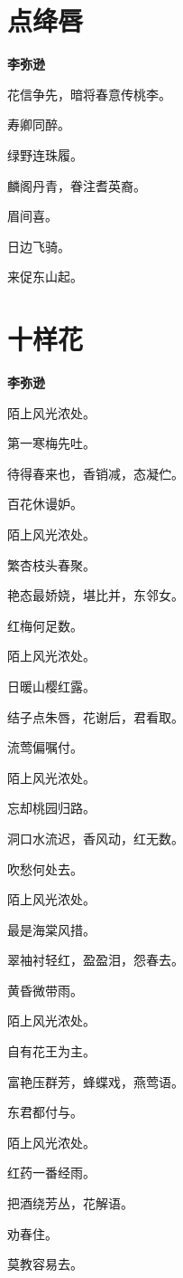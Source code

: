 \documentclass[12pt,a4paper]{ctexbook}
\begin{document}
\section{点绛唇}
\textbf{李弥逊}\par\vspace{0.5em}
花信争先，暗将春意传桃李。\par
寿卿同醉。\par
绿野连珠履。\par
麟阁丹青，眷注耆英裔。\par
眉间喜。\par
日边飞骑。\par
来促东山起。\par

\section{十样花}
\textbf{李弥逊}\par\vspace{0.5em}
陌上风光浓处。\par
第一寒梅先吐。\par
待得春来也，香销减，态凝伫。\par
百花休谩妒。\par
陌上风光浓处。\par
繁杏枝头春聚。\par
艳态最娇娆，堪比并，东邻女。\par
红梅何足数。\par
陌上风光浓处。\par
日暖山樱红露。\par
结子点朱唇，花谢后，君看取。\par
流莺偏嘱付。\par
陌上风光浓处。\par
忘却桃园归路。\par
洞口水流迟，香风动，红无数。\par
吹愁何处去。\par
陌上风光浓处。\par
最是海棠风措。\par
翠袖衬轻红，盈盈泪，怨春去。\par
黄昏微带雨。\par
陌上风光浓处。\par
自有花王为主。\par
富艳压群芳，蜂蝶戏，燕莺语。\par
东君都付与。\par
陌上风光浓处。\par
红药一番经雨。\par
把酒绕芳丛，花解语。\par
劝春住。\par
莫教容易去。\par
\end{document}
